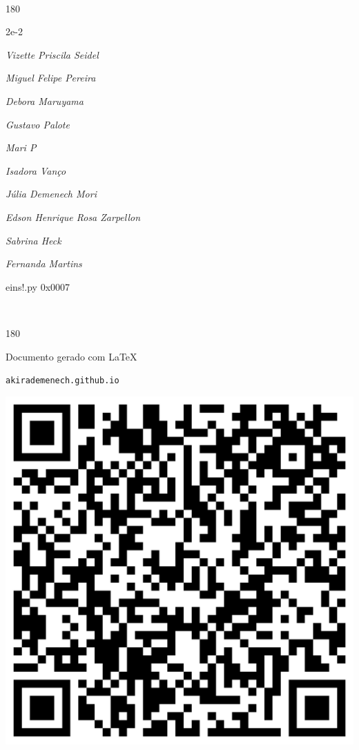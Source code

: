 \documentclass[12pt]{article}
\begin{document}
	\ 
	\vfill
	\begin{turn}{180}	
		\begin{minipage}{\textwidth}
		  	\ttfamily %
			\centering
			{\Huge 2e-2}
		  
			\hfill
		  
			

\textit{\small Vizette Priscila Seidel}

\textit{\small Miguel Felipe Pereira}

\textit{\small Debora Maruyama}

\textit{\small Gustavo Palote}

\textit{\small Mari P}

\textit{\small Isadora Vanço}

\textit{\small Júlia Demenech Mori}

\textit{\small Edson Henrique Rosa Zarpellon}

\textit{\small Sabrina Heck}

\textit{\small Fernanda Martins}

\bigskip

eins!.py
0x0007


		\end{minipage}	
	\end{turn}
	\vfill
	\

\pagebreak

	\begin{turn}{180}	
		\begin{minipage}{\textwidth}		  
		  Documento gerado com \LaTeX			
		  
		  \texttt{akirademenech.github.io}

		  \includegraphics[height=0.3\textheight]{2e-2.pdf}

		\end{minipage}	
	\end{turn}  
		  
\end{document}
